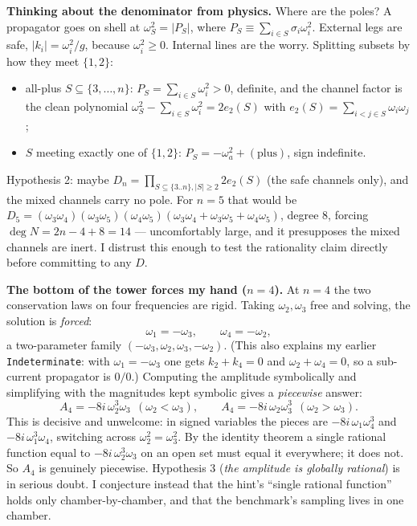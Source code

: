 \documentclass[11pt]{article}
\begin{document}
\medskip
\noindent\textbf{Thinking about the denominator from physics.}
Where are the poles? A propagator goes on shell at $\omega_S^2=|P_S|$, where
$P_S\equiv\sum_{i\in S}\sigma_i\omega_i^2$. External legs are safe, $|k_i|=\omega_i^2/g$,
because $\omega_i^2\ge0$. Internal lines are the worry. Splitting subsets by how they meet
$\{1,2\}$:
\begin{itemize}
\item all-plus $S\subseteq\{3,\dots,n\}$: $P_S=\sum_{i\in S}\omega_i^2>0$, definite, and the
channel factor is the clean polynomial $\omega_S^2-\sum_{i\in S}\omega_i^2=2e_2(S)$ with
$e_2(S)=\sum_{i<j\in S}\omega_i\omega_j$;
\item $S$ meeting exactly one of $\{1,2\}$: $P_S=-\omega_a^2+(\text{plus})$, sign indefinite.
\end{itemize}
Hypothesis 2: maybe $D_n=\prod_{S\subseteq\{3..n\},|S|\ge2}2e_2(S)$ (the safe channels only),
and the mixed channels carry no pole. For $n=5$ that would be
$D_5=(\omega_3\omega_4)(\omega_3\omega_5)(\omega_4\omega_5)(\omega_3\omega_4+\omega_3\omega_5+\omega_4\omega_5)$,
degree $8$, forcing $\deg N=2n-4+8=14$ --- uncomfortably large, and it presupposes the
mixed channels are inert. I distrust this enough to test the rationality claim directly
before committing to any $D$.

\medskip
\noindent\textbf{The bottom of the tower forces my hand ($n=4$).}
At $n=4$ the two conservation laws on four frequencies are rigid. Taking $\omega_2,\omega_3$
free and solving, the solution is \emph{forced}:
\[
\omega_1=-\omega_3,\qquad \omega_4=-\omega_2,
\]
a two-parameter family $(-\omega_3,\omega_2,\omega_3,-\omega_2)$. (This also explains my
earlier \texttt{Indeterminate}: with $\omega_1=-\omega_3$ one gets $k_2+k_4=0$ and
$\omega_2+\omega_4=0$, so a sub-current propagator is $0/0$.) Computing the amplitude
symbolically and simplifying with the magnitudes kept symbolic gives a \emph{piecewise}
answer:
\[
A_4=-8i\,\omega_2^3\omega_3\ \ (\omega_2<\omega_3),\qquad
A_4=-8i\,\omega_2\omega_3^3\ \ (\omega_2>\omega_3).
\]
This is decisive and unwelcome: in signed variables the pieces are
$-8i\,\omega_1\omega_4^3$ and $-8i\,\omega_1^3\omega_4$, switching across
$\omega_2^2=\omega_3^2$. By the identity theorem a single rational function equal to
$-8i\,\omega_2^3\omega_3$ on an open set must equal it everywhere; it does not. So $A_4$ is
genuinely piecewise. Hypothesis 3 (\emph{the amplitude is globally rational}) is in serious
doubt. I conjecture instead that the hint's ``single rational function'' holds only
chamber-by-chamber, and that the benchmark's sampling lives in one chamber.
\end{document}
